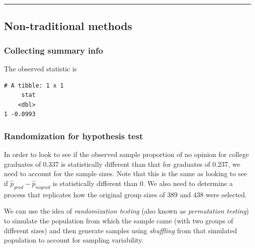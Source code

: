 \documentclass[12pt,]{krantz}
\makeatletter
\newenvironment{Shaded}{\begin{snugshade}}{\end{snugshade}}
\newcommand{\KeywordTok}[1]{\textcolor[rgb]{0.27,0.27,0.27}{\textbf{#1}}}
\newcommand{\DataTypeTok}[1]{\textcolor[rgb]{0.27,0.27,0.27}{#1}}
\newcommand{\StringTok}[1]{\textcolor[rgb]{0.5,0.5,0.5}{#1}}
\newcommand{\OperatorTok}[1]{\textcolor[rgb]{0.43,0.43,0.43}{\textbf{#1}}}
\newcommand{\NormalTok}[1]{#1}
\newenvironment{kframe}{%
\medskip{}
\setlength{\fboxsep}{.8em}
 \def\at@end@of@kframe{}%
 \ifinner\ifhmode%
  \def\at@end@of@kframe{\end{minipage}}%
  \begin{minipage}{\columnwidth}%
 \fi\fi%
 \def\FrameCommand##1{\hskip\@totalleftmargin \hskip-\fboxsep
 \colorbox{shadecolor}{##1}\hskip-\fboxsep
     \hskip-\linewidth \hskip-\@totalleftmargin \hskip\columnwidth}%
 \MakeFramed {\advance\hsize-\width
   \@totalleftmargin\z@ \linewidth\hsize
   \@setminipage}}%
 {\par\unskip\endMakeFramed%
 \at@end@of@kframe}
\renewenvironment{Shaded}{\begin{kframe}}{\end{kframe}}
\theoremstyle{definition}
\theoremstyle{definition}
\theoremstyle{definition}
\theoremstyle{remark}
\makeatother
\begin{document}
\begin{center}\rule{0.5\linewidth}{\linethickness}\end{center}

\subsection{Non-traditional methods}\label{non-traditional-methods-2}

\subsubsection*{Collecting summary info}\label{collecting-summary-info}


The observed statistic is

\begin{Shaded}
\end{Shaded}

\begin{verbatim}
# A tibble: 1 x 1
     stat
    <dbl>
1 -0.0993
\end{verbatim}

\subsubsection*{Randomization for hypothesis
test}\label{randomization-for-hypothesis-test}


In order to look to see if the observed sample proportion of no opinion
for college graduates of 0.337 is statistically different than that for
graduates of 0.237, we need to account for the sample sizes. Note that
this is the same as looking to see if
\(\hat{p}_{grad} - \hat{p}_{nograd}\) is statistically different than 0.
We also need to determine a process that replicates how the original
group sizes of 389 and 438 were selected.

We can use the idea of \emph{randomization testing} (also known as
\emph{permutation testing}) to simulate the population from which the
sample came (with two groups of different sizes) and then generate
samples using \emph{shuffling} from that simulated population to account
for sampling variability.
\end{document}
